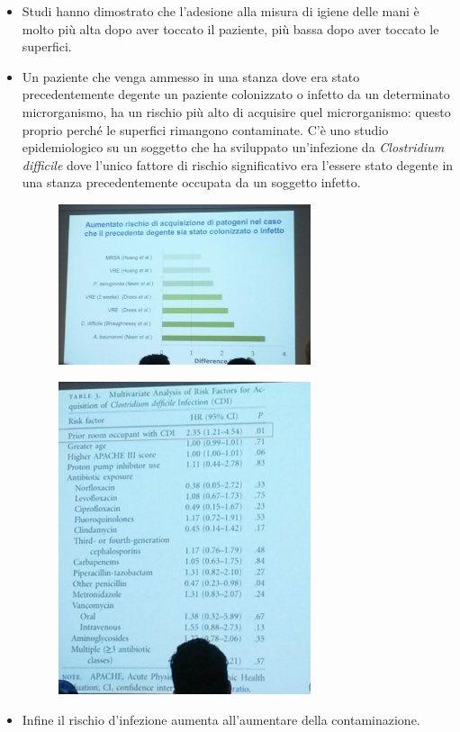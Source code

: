 \begin{itemize}
\item Studi hanno dimostrato che l'adesione alla misura di igiene delle mani è molto più alta dopo aver toccato il paziente, più bassa dopo aver toccato le superfici.

\item Un paziente che venga ammesso in una stanza dove era stato precedentemente degente un paziente colonizzato o infetto da un determinato microrganismo, ha un rischio più alto di acquisire quel microrganismo: questo proprio perché le superfici rimangono contaminate. C'è uno studio epidemiologico su un soggetto che ha sviluppato un'infezione da \emph{Clostridium difficile} dove l'unico fattore di rischio significativo era l'essere stato degente in una stanza precedentemente occupata da un soggetto infetto.

\begin{figure}[!ht]
\centering
	\includegraphics[width=0.7\textwidth]{19/image17.jpeg}
	\end{figure}
	
\begin{figure}[!ht]
\centering
	\includegraphics[width=0.7\textwidth]{19/image18.jpeg}
	\end{figure}

\item Infine il rischio d'infezione aumenta all'aumentare della contaminazione.

\end{itemize}
